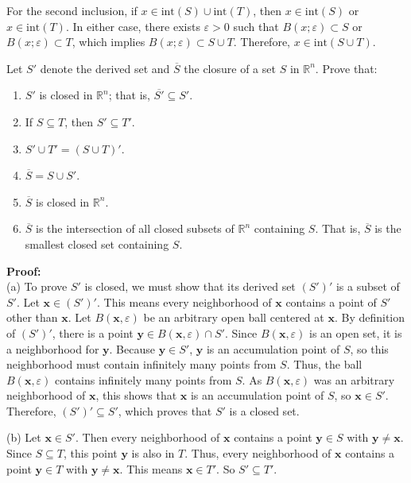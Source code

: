 For the second inclusion, if $x \in \text{int}(S) \cup \text{int}(T)$, then $x \in \text{int}(S)$ or $x \in \text{int}(T)$. In either case, there exists $\varepsilon > 0$ such that $B(x;\varepsilon) \subset S$ or $B(x;\varepsilon) \subset T$, which implies $B(x;\varepsilon) \subset S \cup T$. Therefore, $x \in \text{int}(S \cup T)$.

\begin{problembox}
Let $S'$ denote the derived set and $\overline{S}$ the closure of a set $S$ in $\mathbb{R}^n$. Prove that:
\begin{enumerate}[label=\alph*)]
\item $S'$ is closed in $\mathbb{R}^n$; that is, $\overline{S'} \subseteq S'$.
\item If $S \subseteq T$, then $S' \subseteq T'$.
\item $S' \cup T' = (S \cup T)'$.
\item $\overline{S} = S \cup S'$.
\item $\overline{S}$ is closed in $\mathbb{R}^n$.
\item $\overline{S}$ is the intersection of all closed subsets of $\mathbb{R}^n$ containing $S$. That is, $\overline{S}$ is the smallest closed set containing $S$.
\end{enumerate}
\end{problembox}
\textbf{Proof:}\\
(a) To prove $S'$ is closed, we must show that its derived set $(S')'$ is a subset of $S'$. Let $\mathbf{x} \in (S')'$. This means every neighborhood of $\mathbf{x}$ contains a point of $S'$ other than $\mathbf{x}$. Let $B(\mathbf{x}, \varepsilon)$ be an arbitrary open ball centered at $\mathbf{x}$. By definition of $(S')'$, there is a point $\mathbf{y} \in B(\mathbf{x}, \varepsilon) \cap S'$. Since $B(\mathbf{x}, \varepsilon)$ is an open set, it is a neighborhood for $\mathbf{y}$. Because $\mathbf{y} \in S'$, $\mathbf{y}$ is an accumulation point of $S$, so this neighborhood must contain infinitely many points from $S$. Thus, the ball $B(\mathbf{x}, \varepsilon)$ contains infinitely many points from $S$. As $B(\mathbf{x}, \varepsilon)$ was an arbitrary neighborhood of $\mathbf{x}$, this shows that $\mathbf{x}$ is an accumulation point of $S$, so $\mathbf{x} \in S'$. Therefore, $(S')' \subseteq S'$, which proves that $S'$ is a closed set.

(b) Let $\mathbf{x} \in S'$. Then every neighborhood of $\mathbf{x}$ contains a point $\mathbf{y} \in S$ with $\mathbf{y} \neq \mathbf{x}$. Since $S \subseteq T$, this point $\mathbf{y}$ is also in $T$. Thus, every neighborhood of $\mathbf{x}$ contains a point $\mathbf{y} \in T$ with $\mathbf{y} \neq \mathbf{x}$. This means $\mathbf{x} \in T'$. So $S' \subseteq T'$.

